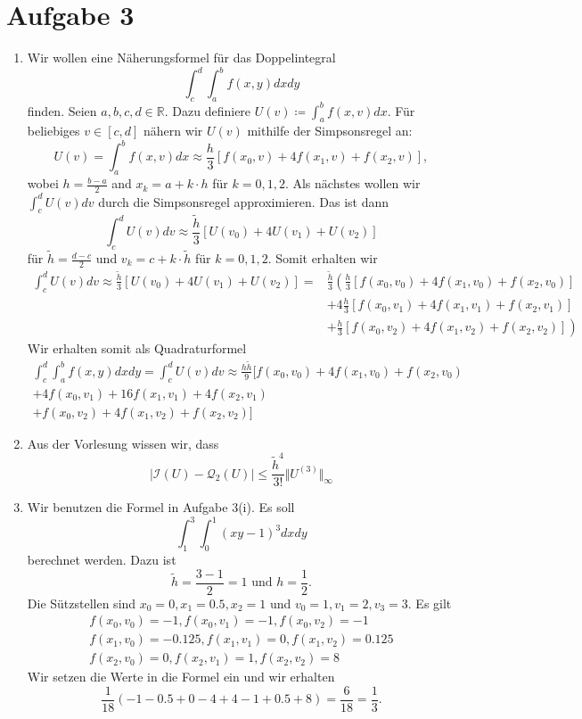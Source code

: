 \documentclass[a4paper]{extarticle}
\theoremstyle{named}
\begin{document}
\section*{Aufgabe 3}
\begin{enumerate}[label=(\roman*)]
	\item Wir wollen eine Näherungsformel für das Doppelintegral
	\[
		\int^d_c \int^b_a f(x,y) dx dy
	\]
	finden. Seien $a,b,c,d \in \mathbb R$. Dazu definiere $U(v) \coloneqq \int^b_a f(x,v) dx$. Für beliebiges $v \in [c,d]$ nähern wir $U(v)$ mithilfe der Simpsonsregel an:
	\[
		U(v) =   \int^b_a f(x,v) dx \approx \frac{h}{3}[f(x_0,v)+4f(x_1,v) + f(x_2,v)],
	\]
	wobei $h = \frac{b-a}{2}$ and $x_k = a + k \cdot h$ für $k = 0,1,2$. Als nächstes wollen wir
	$
		\int^d_c U(v) dv
	$
	durch die Simpsonsregel approximieren. Das ist dann
	\[
		\int^d_c U(v) dv \approx \frac{\tilde h}{3}[U(v_0) + 4U(v_1) + U(v_2)]
	\]
	für $\tilde h = \frac{d-c}{2}$ und $v_k = c + k \cdot \tilde h$ für $k=0,1,2$. Somit erhalten wir
	\begin{align*}
		\int^d_c U(v) dv \approx \frac{\tilde h}{3}[U(v_0) + 4U(v_1) + U(v_2)] 
		=& \frac{\tilde h}{3}\left( \frac{h}{3}[f(x_0,v_0)+4f(x_1,v_0) + f(x_2,v_0)]\right.\\
		 &+ 4 \frac{h}{3}[f(x_0,v_1)+4f(x_1,v_1) + f(x_2,v_1)]  \\
		&+  \left. \frac{h}{3}[f(x_0,v_2)+4f(x_1,v_2) + f(x_2,v_2)] \right)
	\end{align*}
	Wir erhalten somit als Quadraturformel
	\begin{align*}
			\int^d_c \int^b_a f(x,y) dx dy =  \int^d_c U(v) dv \approx \frac{h \tilde h}{9}[
		f(x_0,v_0)+4f(x_1,v_0) + f(x_2,v_0) \\
		+4 f(x_0,v_1)+16f(x_1,v_1) + 4f(x_2,v_1)\\
		+f(x_0,v_2)+4f(x_1,v_2) + f(x_2,v_2)
		]
	\end{align*}
	
	\item Aus der Vorlesung wissen wir, dass
	\[
		|\mathcal I(U) - \mathcal Q_2(U)| \leq \frac{\tilde h^{4}}{3!} \Vert U^{(3)} \Vert_{\infty}
	\]
	
	\item Wir benutzen die Formel in Aufgabe 3(i). Es soll 
	\[
		\int^3_1 \int^1_0 (xy-1)^3dxdy
	\]
	berechnet werden. Dazu ist
	\[
		\tilde h = \frac{3-1}{2} = 1 \text{ und } h = \frac{1}{2}.
	\]
	Die Sützstellen sind $x_0 = 0, x_1 = 0.5, x_2 = 1$ und $v_0 = 1, v_1 = 2, v_3 = 3$. Es gilt 
	\begin{gather*}
		f(x_0,v_0) = -1, f(x_0,v_1) = -1, f(x_0,v_2) = -1  \\
		f(x_1,v_0) = -0.125, f(x_1,v_1) = 0, f(x_1,v_2) = 0.125 \\
		f(x_2,v_0) = 0, f(x_2,v_1) = 1, f(x_2,v_2) = 8
	\end{gather*}
	Wir setzen die Werte in die Formel ein und wir erhalten
	\[
		\frac{1}{18}(-1-0.5+0-4+4-1+0.5+8) = \frac{6}{18} = \frac{1}{3}.
	\]
\end{enumerate}
\end{document}
